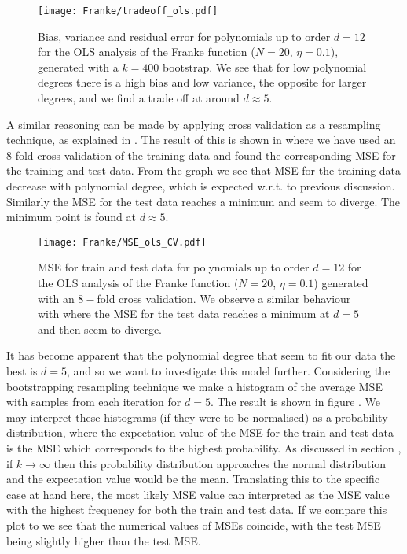             
            \begin{figure}
                \texttt{[image: Franke/tradeoff\_ols.pdf]}
                \caption{Bias, variance and residual error for polynomials up to order $d=12$ for the OLS analysis of the Franke function ($N=20$, $\eta=0.1$), generated with a $k=400$ bootstrap. We see that for low polynomial degrees there is a high bias and low variance, the opposite for larger degrees, and we find a trade off at around $d\approx 5$.}
                \label{fig:bias_variance_ols}
            \end{figure}
            
            
            A similar reasoning can be made by applying cross validation as a resampling technique, as explained in . The result of this is shown in  where we have used an 8-fold cross validation of the training data and found the corresponding MSE for the training and test data. From the graph we see that MSE for the training data decrease with polynomial degree, which is expected w.r.t. to previous discussion. Similarly the MSE for the test data reaches a minimum and seem to diverge. The minimum point is found at $d\approx 5$.

            \begin{figure}
                \texttt{[image: Franke/MSE\_ols\_CV.pdf]}
                \caption{MSE for train and test data for polynomials up to order $d=12$ for the OLS analysis of the Franke function ($N=20$, $\eta=0.1$) generated with an $8-$fold cross validation. We observe a similar behaviour with  where the MSE for the test data reaches a minimum at $d=5$ and then seem to diverge. }
                \label{fig:cross-validation_ols}
            \end{figure} 
            
            It has become apparent that the polynomial degree that seem to fit our data the best is $d=5$, and so we want to investigate this model further. Considering the bootstrapping resampling technique we make a histogram of the average MSE with samples from each iteration for $d=5$. The  result is shown  in figure . We may interpret these histograms (if they were to be normalised) as a probability distribution, where the expectation value of the MSE for the train and test data is the MSE which corresponds to the highest probability. As discussed in section , if $k\to\infty$ then this probability distribution approaches the normal distribution and the expectation value would be the mean. Translating this to the specific case at hand here, the most likely MSE value can interpreted as the MSE value with the highest frequency for both the train and test data. If we compare this plot to  we see that the numerical values of MSEs coincide, with the test MSE being slightly higher than the test MSE. 

